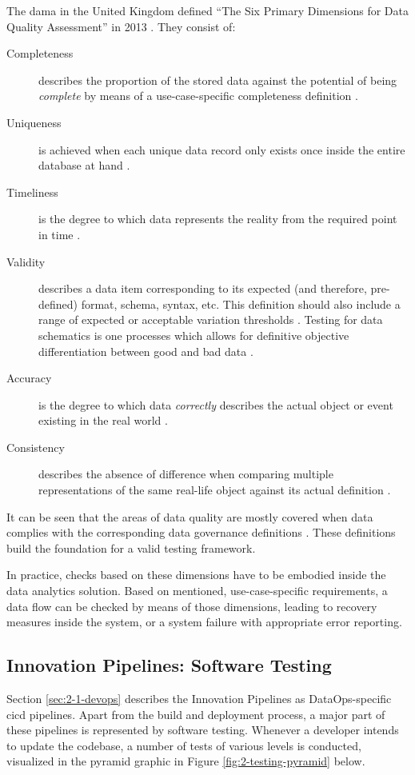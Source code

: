 The \ac{dama} in the United Kingdom defined \enquote{The Six Primary Dimensions for Data Quality Assessment} in 2013 \cite[7\psqq]{Askham2013}. They consist of:

\begin{description}
	\item[Completeness] describes the proportion of the stored data against the potential of being \textit{complete} by means of a use-case-specific completeness definition \cite[8]{Askham2013}\cite{Shen2019}.
	\item[Uniqueness] is achieved when each unique data record only exists once inside the entire database at hand \cite[9]{Askham2013}.
	\item[Timeliness] is the degree to which data represents the reality from the required point in time \cite[10]{Askham2013}.
	\item[Validity] describes a data item corresponding to its expected (and therefore, pre-defined) format, schema, syntax, etc. This definition should also include a range of expected or acceptable variation thresholds \cite[11]{Askham2013}. Testing for data schematics is one processes which allows for definitive objective differentiation between good and bad data \cite{Schieferdecker2012}.
	\item[Accuracy] is the degree to which data \textit{correctly} describes the actual object or event existing in the real world \cite[12]{Askham2013}.
	\item[Consistency] describes the absence of difference when comparing multiple representations of the same real-life object against its actual definition \cite[13]{Askham2013}.
\end{description}

It can be seen that the areas of data quality are mostly covered when data complies with the corresponding data governance definitions \cite{Schieferdecker2012}. These definitions build the foundation for a valid testing framework.

In practice, checks based on these dimensions have to be embodied inside the data analytics solution. Based on mentioned, use-case-specific requirements, a data flow can be checked by means of those dimensions, leading to recovery measures inside the system, or a system failure with appropriate error reporting.

\subsection{Innovation Pipelines: Software Testing} \label{sec:2-2-innovation-pipeline}
Section \ref{sec:2-1-devops} describes the Innovation Pipelines as DataOps-specific \ac{cicd} pipelines. Apart from the build and deployment process, a major part of these pipelines is represented by software testing. Whenever a developer intends to update the codebase, a number of tests of various levels is conducted, visualized in the pyramid graphic in Figure \ref{fig:2-testing-pyramid} below.


